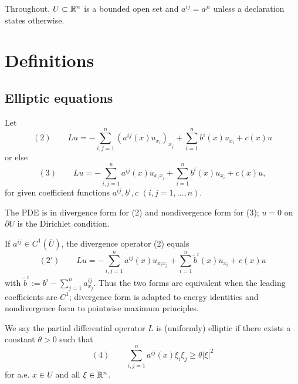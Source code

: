 
Throughout, $U\subset\mathbb{R}^n$ is a bounded open set and $a^{ij}=a^{ji}$ unless a declaration states otherwise.

\section{Definitions}
\label{sec:elliptic-equations-definitions}

\subsection{Elliptic equations}

\begin{definition}
\label{def:divergence-nondivergence-form}
Let
$$(2) \qquad Lu = -\sum_{i,j=1}^n \left(a^{ij}(x)u_{x_i}\right)_{x_j} + \sum_{i=1}^n b^i(x)u_{x_i} + c(x)u$$
or else
$$(3) \qquad Lu = -\sum_{i,j=1}^n a^{ij}(x)u_{x_ix_j} + \sum_{i=1}^n b^i(x)u_{x_i} + c(x)u,$$
for given coefficient functions $a^{ij}, b^i, c$ $(i,j=1,\ldots,n)$.

The PDE is in divergence form for (2) and nondivergence form for (3); $u=0$ on $\partial U$ is the Dirichlet condition.
\end{definition}

\begin{remark}
\label{rem:elliptic-operator-form-conversion}

If $a^{ij}\in C^1(\bar U)$, the divergence operator (2) equals
$$(2') \qquad Lu = -\sum_{i,j=1}^n a^{ij}(x)u_{x_ix_j} + \sum_{i=1}^n \tilde b^i(x)u_{x_i} + c(x)u$$
with $\tilde b^i := b^i - \sum_{j=1}^n a^{ij}_{x_j}$. Thus the two forms are equivalent when the leading coefficients are $C^1$; divergence form is adapted to energy identities and nondivergence form to pointwise maximum principles.
\end{remark}

\begin{definition}
\label{def:uniform-ellipticity}

We say the partial differential operator $L$ is (uniformly) elliptic if there exists a constant $\theta > 0$ such that
$$(4) \qquad \sum_{i,j=1}^n a^{ij}(x)\xi_i\xi_j \geq \theta|\xi|^2$$
for a.e. $x \in U$ and all $\xi \in \mathbb{R}^n$.
\end{definition}

